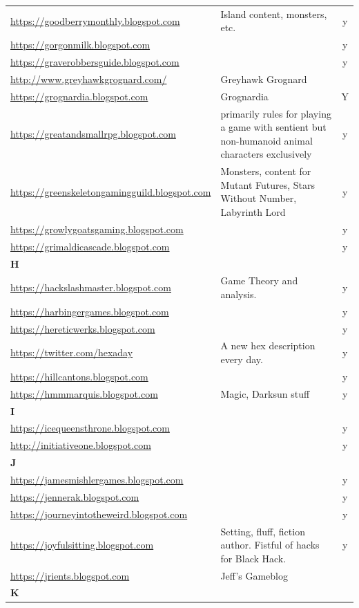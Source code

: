 \documentclass[a4paper, 11pt, twoside]{article}
\begin{document}
\begin{longtable}{p{6cm}p{8cm}c}
\url{https://goodberrymonthly.blogspot.com} & Island content, monsters, etc. & y\\
\url{https://gorgonmilk.blogspot.com} &  & y\\
\url{https://graverobbersguide.blogspot.com} &  & y\\
\url{http://www.greyhawkgrognard.com/} & Greyhawk Grognard & \\
\url{https://grognardia.blogspot.com} & Grognardia & Y\\
\url{https://greatandsmallrpg.blogspot.com} & primarily rules for playing a game with sentient but non-humanoid animal characters exclusively & y\\
\url{https://greenskeletongamingguild.blogspot.com} & Monsters, content for Mutant Futures, Stars Without Number, Labyrinth Lord & y\\
\url{https://growlygoatsgaming.blogspot.com} &  & y\\
\url{https://grimaldicascade.blogspot.com} &  & y\\
\textbf{H} &  & \\
\url{https://hackslashmaster.blogspot.com} & Game Theory and analysis. & y\\
\url{https://harbingergames.blogspot.com} &  & y\\
\url{https://hereticwerks.blogspot.com} &  & y\\
\url{https://twitter.com/hexaday} & A new hex description every day. & y\\
\url{https://hillcantons.blogspot.com} &  & y\\
\url{https://hmmmarquis.blogspot.com} & Magic, Darksun stuff & y\\
\textbf{I} &  & \\
\url{https://icequeensthrone.blogspot.com} &  & y\\
\url{http://initiativeone.blogspot.com} &  & y\\
\textbf{J} &  & \\
\url{https://jamesmishlergames.blogspot.com} &  & y\\
\url{https://jennerak.blogspot.com} &  & y\\
\url{https://journeyintotheweird.blogspot.com} &  & y\\
\url{https://joyfulsitting.blogspot.com} & Setting, fluff, fiction author. Fistful of hacks for Black Hack. & y\\
\url{https://jrients.blogspot.com} & Jeff's Gameblog & \\
\textbf{K} &  & \\

\end{longtable}
\end{document}
